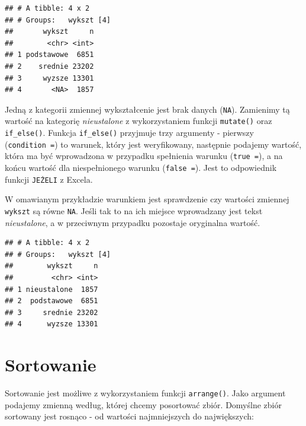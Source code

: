 \documentclass[]{book}
\newenvironment{Shaded}{\begin{snugshade}}{\end{snugshade}}
\newcommand{\KeywordTok}[1]{\textcolor[rgb]{0.13,0.29,0.53}{\textbf{#1}}}
\newcommand{\DataTypeTok}[1]{\textcolor[rgb]{0.13,0.29,0.53}{#1}}
\newcommand{\StringTok}[1]{\textcolor[rgb]{0.31,0.60,0.02}{#1}}
\newcommand{\OperatorTok}[1]{\textcolor[rgb]{0.81,0.36,0.00}{\textbf{#1}}}
\newcommand{\NormalTok}[1]{#1}
\begin{document}
\begin{verbatim}
## # A tibble: 4 x 2
## # Groups:   wykszt [4]
##       wykszt     n
##        <chr> <int>
## 1 podstawowe  6851
## 2    srednie 23202
## 3     wyzsze 13301
## 4       <NA>  1857
\end{verbatim}

Jedną z kategorii zmiennej wykształcenie jest brak danych (\texttt{NA}).
Zamienimy tą wartość na kategorię \emph{nieustalone} z wykorzystaniem
funkcji \texttt{mutate()} oraz \texttt{if\_else()}. Funkcja
\texttt{if\_else()} przyjmuje trzy argumenty - pierwszy
(\texttt{condition\ =}) to warunek, który jest weryfikowany, następnie
podajemy wartość, która ma być wprowadzona w przypadku spełnienia
warunku (\texttt{true\ =}), a na końcu wartość dla niespełnionego
warunku (\texttt{false\ =}). Jest to odpowiednik funkcji \texttt{JEŻELI}
z Excela.

W omawianym przykładzie warunkiem jest sprawdzenie czy wartości zmiennej
\texttt{wykszt} są równe \texttt{NA}. Jeśli tak to na ich miejsce
wprowadzany jest tekst \emph{nieustalone}, a w przeciwnym przypadku
pozostaje oryginalna wartość.

\begin{Shaded}
\end{Shaded}

\begin{verbatim}
## # A tibble: 4 x 2
## # Groups:   wykszt [4]
##        wykszt     n
##         <chr> <int>
## 1 nieustalone  1857
## 2  podstawowe  6851
## 3     srednie 23202
## 4      wyzsze 13301
\end{verbatim}

\section{Sortowanie}\label{sortowanie}

Sortowanie jest możliwe z wykorzystaniem funkcji \texttt{arrange()}.
Jako argument podajemy zmienną według, której chcemy posortować zbiór.
Domyślne zbiór sortowany jest rosnąco - od wartości najmniejszych do
największych:
\end{document}
